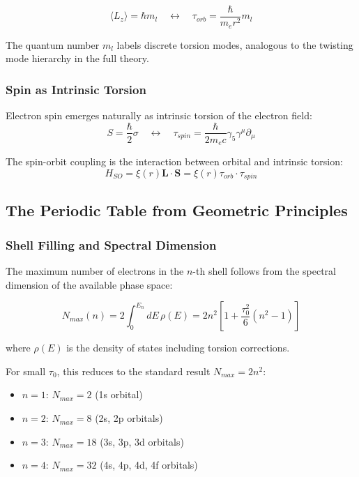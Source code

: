 \begin{equation}
    \langle L_z \rangle = \hbar m_l \quad \leftrightarrow \quad \tau_{orb} = \frac{\hbar}{m_e r^2} m_l
\end{equation}

The quantum number $m_l$ labels discrete torsion modes, analogous to the twisting mode hierarchy in the full theory.

\subsubsection{Spin as Intrinsic Torsion}

Electron spin emerges naturally as intrinsic torsion of the electron field:
\begin{equation}
    S = \frac{\hbar}{2} \sigma \quad \leftrightarrow \quad \tau_{spin} = \frac{\hbar}{2m_e c} \gamma_5 \gamma^\mu \partial_\mu
\end{equation}

The spin-orbit coupling is the interaction between orbital and intrinsic torsion:
\begin{equation}
    H_{SO} = \xi(r) \mathbf{L} \cdot \mathbf{S} = \xi(r) \tau_{orb} \cdot \tau_{spin}
\end{equation}

\subsection{The Periodic Table from Geometric Principles}

\subsubsection{Shell Filling and Spectral Dimension}

The maximum number of electrons in the $n$-th shell follows from the spectral dimension of the available phase space:

\begin{equation}
    N_{max}(n) = 2 \int_0^{E_n} dE \, \rho(E) = 2n^2 \left[1 + \frac{\tau_0^2}{6}(n^2-1)\right]
\end{equation}

where $\rho(E)$ is the density of states including torsion corrections.

For small $\tau_0$, this reduces to the standard result $N_{max} = 2n^2$:
\begin{itemize}
    \item $n=1$: $N_{max} = 2$ (1s orbital)
    \item $n=2$: $N_{max} = 8$ (2s, 2p orbitals)
    \item $n=3$: $N_{max} = 18$ (3s, 3p, 3d orbitals)
    \item $n=4$: $N_{max} = 32$ (4s, 4p, 4d, 4f orbitals)
\end{itemize}

